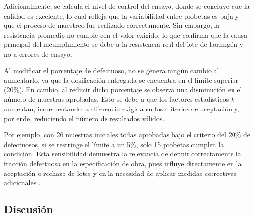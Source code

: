 Adicionalmente, se calcula el nivel de control del ensayo, donde se concluye que la calidad es excelente, lo cual refleja que la variabilidad entre probetas es baja y que el proceso de muestreo fue realizado correctamente. Sin embargo, la resistencia promedio no cumple con el valor exigido, lo que confirma que la causa principal del incumplimiento se debe a la resistencia real del lote de hormigón y no a errores de ensayo.

Al modificar el porcentaje de defectuoso, no se genera ningún cambio al aumentarlo, ya que la dosificación entregada se encuentra en el límite superior (20\%). En cambio, al reducir dicho porcentaje se observa una disminución en el número de muestras aprobadas. Esto se debe a que los factores estadísticos $k$ aumentan, incrementando la diferencia exigida en los criterios de aceptación y, por ende, reduciendo el número de resultados válidos. 

Por ejemplo, con 26 muestras iniciales todas aprobadas bajo el criterio del 20\% de defectuosos, si se restringe el límite a un 5\%, solo 15 probetas cumplen la condición. Esta sensibilidad demuestra la relevancia de definir correctamente la fracción defectuosa en la especificación de obra, pues influye directamente en la aceptación o rechazo de lotes y en la necesidad de aplicar medidas correctivas adicionales \citep{NCh1998}.


\subsection{Discusión}

